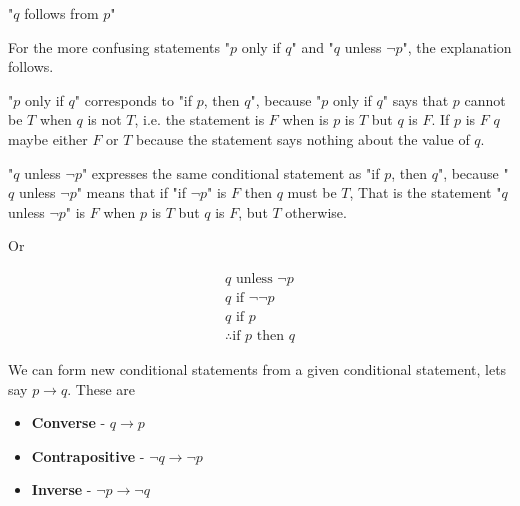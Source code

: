 \documentclass[12pt letter]{report}
\begin{document}
"$q$ follows from $p$"

For the more confusing statements "$p$ only if $q$" and "$q$ unless $\neg p$", the explanation follows.

"$p$ only if $q$" corresponds to "if $p$, then $q$", because "$p$ only if $q$" says that $p$ cannot be $T$ when $q$ is not
$T$, i.e. the statement is $F$ when is $p$ is $T$ but $q$ is $F$. If $p$ is $F$ $q$ maybe either $F$ or $T$ because the
statement says nothing about the value of $q$.

"$q$ unless $\neg p$" expresses the same conditional statement as "if $p$, then $q$", because "$q$ unless $\neg p$"
means that if "if $\neg p$" is $F$ then $q$ must be $T$, That is the statement "$q$ unless $\neg p$" is $F$ when $p$ is
$T$ but $q$ is $F$, but $T$ otherwise.

Or

\begin{align*}
  q \text{ unless } \neg p  \\
  q \text{ if } \neg \neg p \\
  q \text{ if } p           \\
  \therefore \text{if } p \text{ then } q
\end{align*}


We can form new conditional statements from a given conditional statement, lets say $p \to q$. These are

\begin{itemize}
  \item \textbf{Converse} - $q \to  p$
  \item \textbf{Contrapositive} - $\neg q \to \neg p$
  \item \textbf{Inverse} - $\neg p \to \neg q$
\end{itemize}

\end{document}
